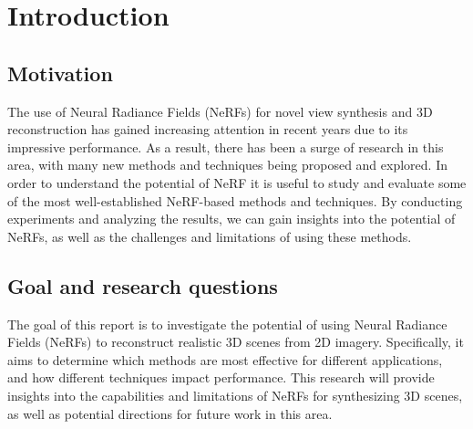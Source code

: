 \chapter{Introduction}

\begin{comment}    
1.1 Motivation

1.2 Goal and research questions
The overall goal of this research is ...
RQ1, RQ2, ...
- Pipeline
- Eksperimenter

1.3 Thesis outline
\end{comment}


\section{Motivation}
The use of Neural Radiance Fields (NeRFs) for novel view synthesis and 3D reconstruction has gained increasing attention in recent years due to its impressive performance. As a result, there has been a surge of research in this area, with many new methods and techniques being proposed and explored. In order to understand the potential of NeRF it is useful to study and evaluate some of the most well-established NeRF-based methods and techniques. By conducting experiments and analyzing the results, we can gain insights into the potential of NeRFs, as well as the challenges and limitations of using these methods.

\section{Goal and research questions}

The goal of this report is to investigate the potential of using Neural Radiance Fields (NeRFs) to reconstruct realistic 3D scenes from 2D imagery. Specifically, it aims to determine which methods are most effective for different applications, and how different techniques impact performance. This research will provide insights into the capabilities and limitations of NeRFs for synthesizing 3D scenes, as well as potential directions for future work in this area.

